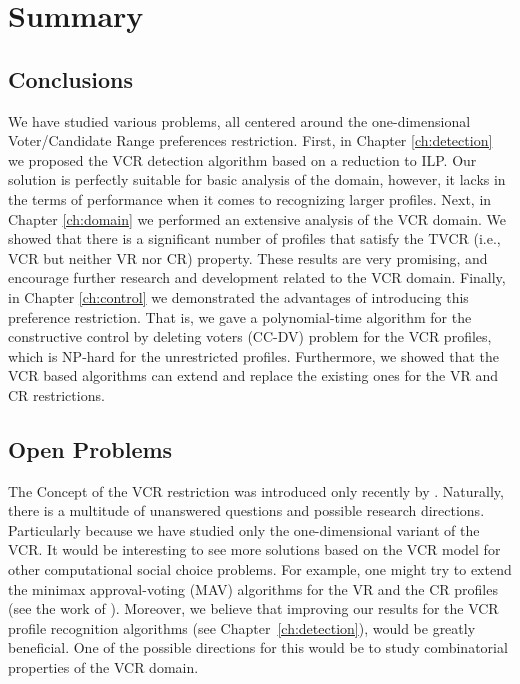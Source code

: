 \chapter{Summary}

\ifpdf
    \graphicspath{{Chapter6/Figs/Raster/}{Chapter6/Figs/PDF/}{Chapter6/Figs/}}
\else
    \graphicspath{{Chapter6/Figs/Vector/}{Chapter6/Figs/}}
\fi


\section{Conclusions} 
We have studied various problems, all centered around the one-dimensional Voter/Candidate Range preferences restriction.
First, in Chapter \ref{ch:detection} we proposed the VCR detection algorithm based on a reduction to ILP.
Our solution is perfectly suitable for basic analysis of the domain,
however, it lacks in the terms of performance when it comes to recognizing larger profiles.
Next, in Chapter \ref{ch:domain} we performed an extensive analysis of the VCR domain.
We showed that there is a significant number of profiles that satisfy the TVCR (i.e., VCR but neither VR nor CR) property.
These results are very promising, and encourage further research and development related to the VCR domain.
Finally, in Chapter \ref{ch:control} we demonstrated the advantages of introducing this preference restriction.
That is, we gave a polynomial-time algorithm for the constructive control by deleting voters (CC-DV) problem
for the VCR profiles, which is NP-hard for the unrestricted profiles.
Furthermore, we showed that the VCR based algorithms can extend and replace the existing ones for the VR and CR restrictions.


\section{Open Problems} %
The Concept of the VCR restriction was introduced only recently by \cite{faliszewski-vcr}.
Naturally, there is a multitude of unanswered questions and possible research directions.
Particularly because we have studied only the one-dimensional variant of the VCR.
It would be interesting to see more solutions based on the VCR model for other computational social choice problems.
For example, one might try to extend the minimax approval-voting (MAV) algorithms for the VR and the CR profiles (see the work of \cite{cr-vr-mav-liu-guo}).
Moreover, we believe that improving our results for the VCR profile recognition algorithms (see Chapter~\ref{ch:detection}), would be greatly beneficial.
One of the possible directions for this would be to study combinatorial properties of the VCR domain. 